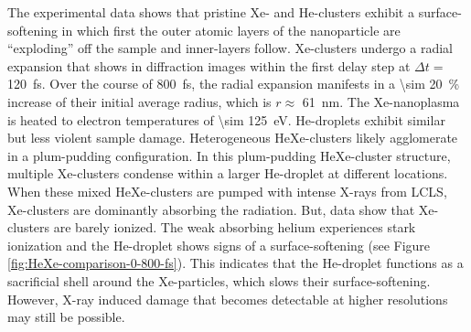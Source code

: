 %
%
The experimental data shows that pristine Xe- and He-clusters exhibit a surface-softening in which first the outer atomic layers of the nanoparticle are ``exploding'' off the sample and inner-layers follow. Xe-clusters undergo a radial expansion that shows in diffraction images within the first delay step at $\Delta t =$ \SI{120}{\femto\second}. Over the course of \SI{800}{\femto\second}, the radial expansion manifests in a \SI{\sim 20}{\percent} increase of their initial average radius, which is $r\approx$ \SI{61}{\nano\meter}. The Xe-nanoplasma is heated to electron temperatures of \SI{\sim 125}{\electronvolt}. He-droplets exhibit similar but less violent sample damage. Heterogeneous HeXe-clusters likely agglomerate in a plum-pudding configuration. In this plum-pudding HeXe-cluster structure, multiple Xe-clusters condense within a larger He-droplet at different locations. When these mixed HeXe-clusters are pumped with intense X-rays from LCLS, Xe-clusters are dominantly absorbing the radiation. But, data show that Xe-clusters are barely ionized. The weak absorbing helium experiences stark ionization and the He-droplet shows signs of a surface-softening (see Figure \ref{fig:HeXe-comparison-0-800-fs}). This indicates that the He-droplet functions as a sacrificial shell around the Xe-particles, which slows their surface-softening. However, X-ray induced damage that becomes detectable at higher resolutions may still be possible.\\[1\baselineskip]
